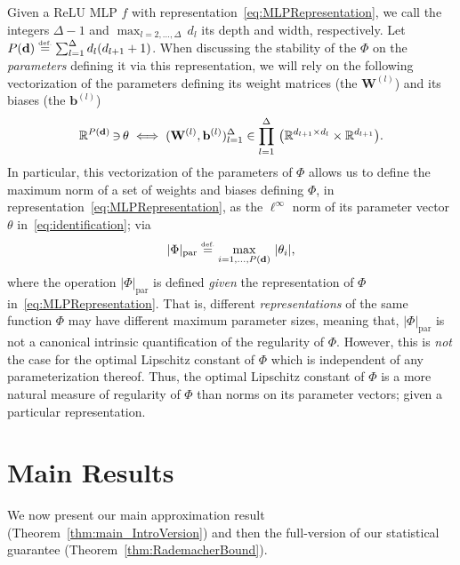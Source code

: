 \documentclass{article}
\numberwithin{equation}{section}
\theoremstyle{definition}
\newcommand{\eqdef}{\ensuremath{\stackrel{\mbox{\upshape\tiny def.}}{=}}}
\begin{document}
Given a ReLU MLP $f$ with representation~\ref{eq:MLPRepresentation}, we call the integers $\Delta-1$ and $\max_{l=2,\dots,\Delta}\,d_l$ its depth and width, respectively.
Let $P(\mathbf{d})  \eqdef  \sum_{l = 1}^{\Delta} d_l (d_{l+1} + 1)$. When discussing the stability of the $\Phi$ on the \textit{parameters} defining it via this representation, we will rely on the following vectorization of the parameters defining its weight matrices (the $\mathbf{W}^{(l)}$) and its biases (the $\mathbf{b}^{(l)}$)
\begin{equation}
\label{eq:identification}
    \mathbb{R}^{P(\mathbf{d})}\,\reflectbox{$\in$}\,\theta \iff (\mathbf{W}^{(l)}, \mathbf{b}^{(l)})_{l=1}^{\Delta}
    \in \prod_{l=1}^{\Delta}\, \big(\mathbb{R}^{d_{l+1}\times d_l}\times\mathbb{R}^{d_{l+1}} \big).
\end{equation}
In particular, this vectorization of the parameters of $\Phi$ allows us to define the maximum norm of a set of weights and biases defining $\Phi$, in representation~\eqref{eq:MLPRepresentation}, as the $\ell^{\infty}$ norm of its parameter vector $\theta$ in~\eqref{eq:identification}; via
\begin{equation}
\label{eq:parameter_norm}
    |\Phi|_{\operatorname{par}}
    \eqdef 
    \max_{i=1,\dots,P(\mathbf{d})}\, |\theta_i|
    ,
\end{equation}
where the operation $|\Phi|_{\operatorname{par}}$ is defined \textit{given} the representation of $\Phi$ in~\eqref{eq:MLPRepresentation}.  
That is, different \textit{representations} of the same function $\Phi$ may have different maximum parameter sizes, meaning that, $|\Phi|_{\operatorname{par}}$ is not a canonical intrinsic quantification of the regularity of $\Phi$.  
However, this is \textit{not} the case for the optimal Lipschitz constant of $\Phi$ which is independent of any parameterization thereof. Thus, the optimal Lipschitz constant of $\Phi$ is a more natural measure of regularity of $\Phi$ than norms on its parameter vectors; given a particular representation.




\section{Main Results}
\label{s:Main}
We now present our main approximation result (Theorem~\ref{thm:main_IntroVersion}) and then the full-version of our statistical guarantee (Theorem~\ref{thm:RademacherBound}).
\end{document}
